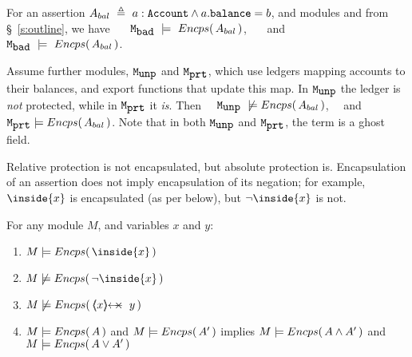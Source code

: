 
\begin{example}
\label{ex:not:encaps}
For an assertion $A_{bal}\  \triangleq\ a:\prg{Account}\wedge a.\prg{balance}=b$, %
and modules \ModB and  \ModC  from \S~\ref{s:outline}, we have  \ \ \ $\mbox{\normalfont{\texttt{M}}}_{\mbox{\normalfont{\texttt{bad}}}}\ \models\ {Encps(\,  A_{bal} \, )}$, \ \ \ and \ \ \ $\mbox{\normalfont{\texttt{M}}}_{\mbox{\normalfont{\texttt{bad}}}}\ \models\ {Encps(\,  A_{bal} \, )}$.
\end{example}


\begin{example} Assume   further modules, $\mbox{\normalfont{\texttt{M}}}_{\mbox{\normalfont{\texttt{unp}}}}$ and $\mbox{\normalfont{\texttt{M}}}_{\mbox{\normalfont{\texttt{prt}}}}$,  which  use ledgers mapping  accounts to their balances, and export functions that update this map. In  $\mbox{\normalfont{\texttt{M}}}_{\mbox{\normalfont{\texttt{unp}}}}$ the ledger is \emph{not} protected, while in $\mbox{\normalfont{\texttt{M}}}_{\mbox{\normalfont{\texttt{prt}}}}$ it \emph{is}. 
Then  \ \ $\ModD \ \not\models\encaps{ A_{bal}} $, \ \  and \ \ $\mbox{\normalfont{\texttt{M}}}_{\mbox{\normalfont{\texttt{prt}}}}  \models {\ensuremath Encps(\,  A_{bal}\, )} $.
%
% 
\noindent
Note that in both $\mbox{\normalfont{\texttt{M}}}_{\mbox{\normalfont{\texttt{unp}}}}$ and $\mbox{\normalfont{\texttt{M}}}_{\mbox{\normalfont{\texttt{prt}}}}$, the term  is a ghost field. 
\end{example}

Relative protection %
is not encapsulated, but  absolute protection is.
Encapsulation of an assertion does not imply encapsulation of its negation; 
 for example,  ${\inside{x}}$ is encapsulated (as per below), but $\neg  {\inside{x}}$ is not.


\begin{lemma}
For any module $M$, and variables $x$ and $y$:
\begin{enumerate} 
\item $M \models \encaps{\inside{x}}$
\item $M \not\models {\encaps{\neg\inside{x}}}$
\item $M \not\models {\encaps{\protectedFrom{x}{y}}}$
\item  $M \models  {\ensuremath Encps(\, A\, )}$ and $M \models  {\ensuremath Encps(\, A'\, )}$ implies 
$M \models  {\ensuremath Encps(\, A \wedge A'\, )}$ and $M \models  {\ensuremath Encps(\, A \vee A'\, )}$
\end{enumerate}
\end{lemma}

